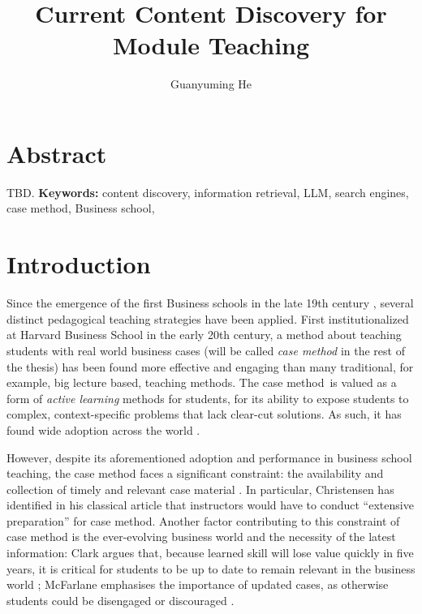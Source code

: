 \documentclass[project-plan]{report-template}
\title{Current Content Discovery for Module Teaching}
\author{Guanyuming He}
\newcommand\casemethod{case method}
\begin{document}
\maketitlepage  

\section*{Abstract}
TBD.
\textbf{Keywords:} content discovery, information retrieval, LLM, search engines, \casemethod, Business school,

\section{Introduction}
Since the emergence of the first Business schools in the late 19th century
\cite{first.bis.school.1, first.bis.school.2}, several distinct pedagogical
teaching strategies have been applied.  First institutionalized at Harvard
Business School \cite{case.method.origin.1, case.method.origin.2} in the early
20th century, a method about teaching students with real world business cases
(will be called \emph{\casemethod} in the rest of the thesis) has been found
more effective and engaging \cite{case.method.support.1, case.method.support.2,
case.method.support.3} than many traditional, for example, big lecture based,
teaching methods. The \casemethod\ is valued as a form of \emph{active
learning} methods for students, for its ability to expose students to complex,
context-specific problems that lack clear-cut solutions. As such, it has found
wide adoption across the world \cite{case.method.adoption.1,
case.method.adoption.2}.

However, despite its aforementioned adoption and performance in business school
teaching, the case method faces a significant constraint: the availability and
collection of timely and relevant case material \cite{case.method.limit.1,
case.method.limit.3}. In particular, Christensen has identified in his classical
article that instructors would have to conduct ``extensive preparation''
\cite{case.method.limit.2} for case method. Another factor contributing to this
constraint of case method is the ever-evolving business world and the necessity
of the latest information: Clark argues that, because learned skill will lose
value quickly in five years, it is critical for students to be up to date to
remain relevant in the business world \cite{case.method.limit.4}; McFarlane
emphasises the importance of updated cases, as otherwise students could be
disengaged or discouraged \cite{case.method.limit.5}.
\end{document}
